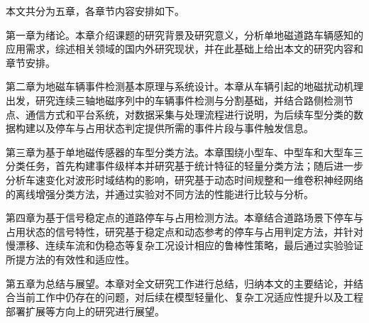 本文共分为五章，各章节内容安排如下。

第一章为绪论。本章介绍课题的研究背景及研究意义，分析单地磁道路车辆感知的应用需求，综述相关领域的国内外研究现状，并在此基础上给出本文的研究内容和章节安排。

第二章为地磁车辆事件检测基本原理与系统设计。本章从车辆引起的地磁扰动机理出发，研究连续三轴地磁序列中的车辆事件检测与分割基础，并结合路侧检测节点、通信方式和平台系统，对数据采集与处理流程进行说明，为后续车型分类的数据构建以及停车与占用状态判定提供所需的事件片段与事件触发信息。

第三章为基于单地磁传感器的车型分类方法。本章围绕小型车、中型车和大型车三分类任务，首先构建事件级样本并研究基于统计特征的轻量分类方法；随后进一步分析车速变化对波形时域结构的影响，研究基于动态时间规整和一维卷积神经网络的离线增强分类方法，并通过实验对不同方法的性能进行比较与分析。

第四章为基于信号稳定点的道路停车与占用检测方法。本章结合道路场景下停车与占用状态的信号特性，研究基于稳定点和动态参考的停车与占用判定方法，并针对慢漂移、连续车流和伪稳态等复杂工况设计相应的鲁棒性策略，最后通过实验验证所提方法的有效性和适应性。

第五章为总结与展望。本章对全文研究工作进行总结，归纳本文的主要结论，并结合当前工作中仍存在的问题，对后续在模型轻量化、复杂工况适应性提升以及工程部署扩展等方向上的研究进行展望。


